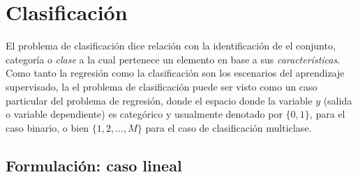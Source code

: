 
\section{Clasificación}

El problema de clasificación dice relación con la identificación de el conjunto, categoría o \emph{clase} a la cual pertenece un elemento en base a sus \emph{características}. Como tanto la regresión como la clasificación son los escenarios del aprendizaje supervisado, la el problema de clasificación puede ser visto como un caso particular del problema de regresión, donde el espacio donde la variable  $y$ (salida o variable dependiente) es  categórico y usualmente denotado por $\{0,1\}$, para el caso binario, o bien $\{1,2,\ldots,M\}$ para el caso de clasificación multiclase. 
	

\subsection{Formulación: caso lineal}
\label{sec:clasif_lineal}

